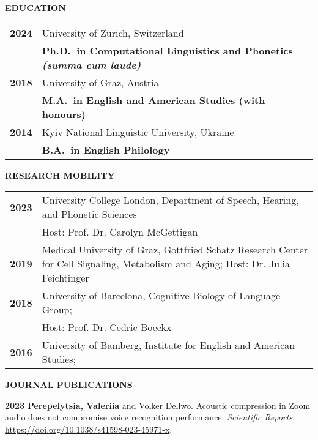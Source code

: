 \documentclass[11pt]{article}
\newcommand{\hangpara}{
 \setlength{\parindent}{0in} %
 \hangindent=0.42in %
}
\begin{document}
\vskip 12pt
\begin{flushleft}
{\bf EDUCATION}
\end{flushleft}
\begin{tabular}{lp{5.5in}}
\bf 2024 & University of Zurich, Switzerland \\
& \textbf{Ph.D.\ in Computational Linguistics and Phonetics \textit{(summa cum laude)}} \\
\bf 2018 & University of Graz, Austria \\
& \textbf{M.A.\ in English and American Studies (with honours)} \\
\bf 2014 & Kyiv National Linguistic University, Ukraine \\
& \textbf{B.A.\ in English Philology} \\
\end{tabular}


\vskip 12pt
\begin{flushleft}
{\bf RESEARCH MOBILITY}
\end{flushleft}
\begin{tabular}{lp{5.5in}}
\bf 2023 & University College London, Department of Speech, Hearing, and Phonetic Sciences \\
& Host: Prof. Dr. Carolyn McGettigan \\
\bf 2019 & Medical University of Graz, Gottfried Schatz Research Center for Cell Signaling, Metabolism and Aging; Host: Dr. Julia Feichtinger \\
\bf 2018 & University of Barcelona, Cognitive Biology of Language Group; \\
& Host: Prof. Dr. Cedric Boeckx \\
\bf 2016 & University of Bamberg, Institute for English and American Studies; \\ 
\end{tabular}



\vskip 18pt
\begin{flushleft}
{\bf JOURNAL PUBLICATIONS}
\end{flushleft}
\vskip 6pt
\hangpara
{\bf 2023}\hspace{1ex} \textbf{Perepelytsia, Valeriia} and Volker Dellwo. Acoustic compression in Zoom audio does not compromise voice recognition performance. \textit{Scientific Reports}. \url{https://doi.org/10.1038/s41598-023-45971-x}.
\end{document}
